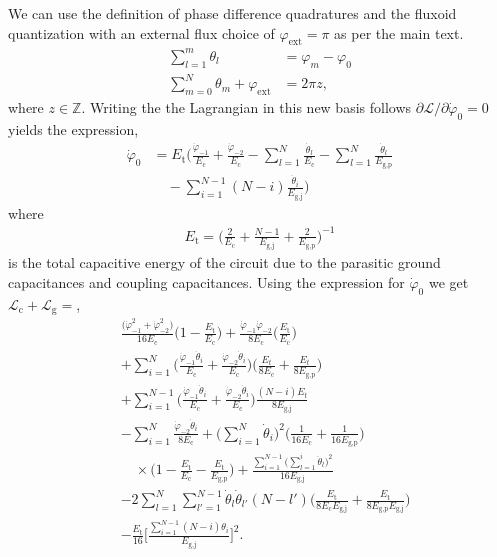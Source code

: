 \documentclass[%
reprint,
superscriptaddress,
 amsmath,amssymb,
 aps,
 prx,
longbibliography,
floatfix,
]{revtex4-2}
\begin{document}
We can use the definition of phase difference quadratures and the fluxoid quantization with an external flux choice of $\varphi_{\mathrm{ext}}=\pi$ as per the main text.
\begin{align}
\sum_{l=1}^m\theta_l&=\varphi_m-\varphi_0\\
\sum_{m=0}^N \theta_m+\varphi_\mathrm{ext}&=2\pi z,
\end{align}
where $z\in\mathbb{Z}$. Writing the the Lagrangian in this new basis follows $\partial \mathcal{L}/\partial \dot{\varphi}_0=0$ yields the expression,
\begin{align}
\dot{\varphi}_0&=E_{\textrm{t}}\Big(\frac{\dot{\varphi}_{-1}}{E_{\textrm{c}}}+\frac{\dot{\varphi}_{-2}}{E_{\textrm{c}}}-\sum_{l=1}^{N}\frac{\dot{\theta}_l}{E_{\textrm{c}}}-\sum_{l=1}^{N}\frac{\dot{\theta}_l}{E_{\textrm{g,p}}}\nonumber\\&\quad-\sum_{i=1}^{N-1}(N-i)\frac{\dot{\theta}_i}{E_{\textrm{g,j}}}\Big)
\end{align}
where
\begin{align}
E_\textrm{t}=\Big(\frac{2}{E_{\textrm{c}}}+\frac{N-1}{E_{\textrm{g,j}}}+\frac{2}{E_{\textrm{g,p}}}\Big)^{-1}\label{eq:tot_cap}
\end{align}
is the total capacitive energy of the circuit due to the parasitic ground capacitances and coupling capacitances. Using the expression for $\dot{\varphi}_0$ we get $\mathcal{L}_\textrm{c}+\mathcal{L}_\textrm{g}=$,
\begin{align}
&\frac{\big(\dot{\varphi}^2_{-1}+\dot{\varphi}^2_{-2}\big)}{16E_\textrm{c}}\Big(1-\frac{E_\textrm{t}}{E_\textrm{c}}\Big)+\frac{\dot{\varphi}_{-1}\dot{\varphi}_{-2}}{8E_\textrm{c}}\Big(\frac{E_\textrm{t}}{E_\textrm{c}}\Big)\nonumber\\
&+\sum_{i=1}^N\Big(\frac{\dot{\varphi}_{-1}\dot{\theta}_i}{E_\textrm{c}}+\frac{\dot{\varphi}_{-2}\dot{\theta}_i}{E_\textrm{c}}\Big)\Big(\frac{E_t}{8E_\textrm{c}}+\frac{E_t}{8E_\textrm{g,p}}\Big)\nonumber\\&+\sum_{i=1}^{N-1}\Big(\frac{\dot{\varphi}_{-1}\dot{\theta}_i}{E_\textrm{c}}+\frac{\dot{\varphi}_{-2}\dot{\theta}_i}{E_\textrm{c}}\Big)\frac{(N-i)E_t}{8E_\textrm{g,j}}\nonumber\\
&-\sum_{i=1}^N\frac{\dot{\varphi}_{-2}\dot{\theta}_i}{8E_\textrm{c}}+\Big(\sum_{i=1}^N\dot{\theta}_i\Big)^2\Bigg(\frac{1}{16E_\textrm{c}}+\frac{1}{16E_\textrm{g,p}}\Bigg)\nonumber\\&\quad\times\Bigg(1-\frac{E_\textrm{t}}{E_\textrm{c}}-\frac{E_\textrm{t}}{E_\textrm{g,p}}\Bigg)+\frac{\sum_{i=1}^{N-1}\big(\sum_{l=1}^i\dot{\theta}_l\big)^2}{16E_\textrm{g,j}}\nonumber\\
&-2\sum_{l=1}^N \sum_{l'=1}^{N-1}\dot{\theta}_l\dot{\theta}_{l'}(N-l')\Bigg(\frac{E_\textrm{t}}{8E_\textrm{c}E_\textrm{g,j}}+\frac{E_\textrm{t}}{8E_\textrm{g,p}E_\textrm{g,j}}\Bigg)\nonumber\\
&-\frac{E_\textrm{t}}{16}\Bigg[\frac{\sum_{i=1}^{N-1}(N-i)\theta_i}{E_\textrm{g,j}}\Bigg]^2.
\end{align}
\end{document}
